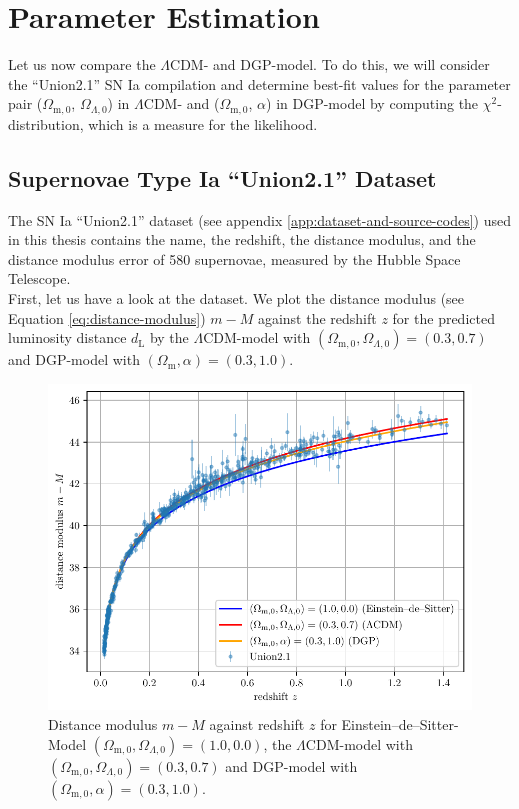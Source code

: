 \chapter{Parameter Estimation}
\label{chap:parameter-estimation}
\thispagestyle{empty}

Let us now compare the $\Lambda$CDM- and DGP-model. To do this, we will consider the ``Union2.1'' SN Ia compilation and determine best-fit values for the parameter pair ($\Omega_{\text{m},0}$, $\Omega_{\Lambda,0}$) in $\Lambda$CDM- and ($\Omega_{\text{m},0}$, $\alpha$) in DGP-model by computing the $\chi^2$-distribution, which is a measure for the likelihood.

\section{Supernovae Type Ia ``Union2.1'' Dataset}

\noindent The SN Ia ``Union2.1'' dataset (see appendix \ref{app:dataset-and-source-codes}) used in this thesis contains the name, the redshift, the distance modulus, and the distance modulus error of 580 supernovae, measured by the Hubble Space Telescope. \\

\noindent First, let us have a look at the dataset. We plot the distance modulus (see Equation \eqref{eq:distance-modulus}) $m - M$ against the redshift $z$ for the predicted luminosity distance $d_{\text{L}}$ by the $\Lambda$CDM-model with $(\Omega_{\text{m},0}, \Omega_{\Lambda,0}) = (0.3, 0.7)$ and DGP-model with $(\Omega_{\text{m}}, \alpha)=(0.3, 1.0)$.

\begin{figure}[H]
   \centering
   \includegraphics[scale=0.97]{figures/plots/PDF/redshift-vs-distance-modulus.pdf}
   \caption{Distance modulus $m - M$ against redshift $z$ for Einstein--de--Sitter-Model $(\Omega_{\text{m},0}, \Omega_{\Lambda,0}) = (1.0, 0.0)$, the $\Lambda$CDM-model with $(\Omega_{\text{m},0}, \Omega_{\Lambda,0}) = (0.3, 0.7)$ and DGP-model with $(\Omega_{\text{m},0}, \alpha) = (0.3, 1.0)$.\\}
   \label{fig:redshift-vs-distance-modulus}
\end{figure}

